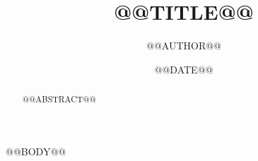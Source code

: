 \documentclass[10pt,twocolumn]{article}
\title{@@TITLE@@}
\author{@@AUTHOR@@}
\date{@@DATE@@}
\begin{document}
\maketitle
\begin{abstract}
@@ABSTRACT@@
\end{abstract}
@@BODY@@


\end{document}
